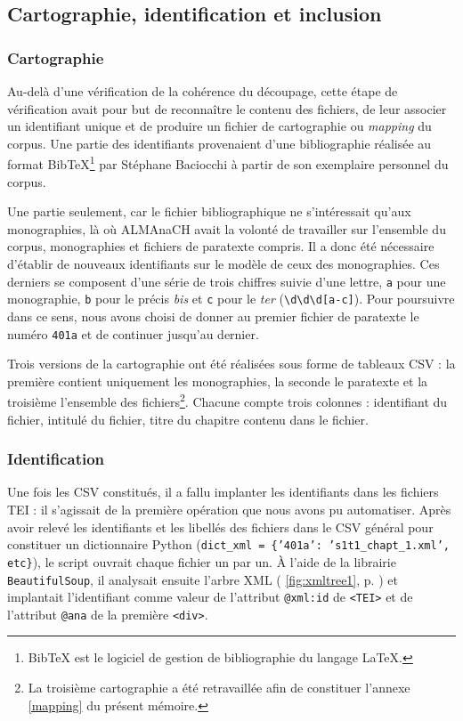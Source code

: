 \subsection{Cartographie, identification et inclusion}

\subsubsection{Cartographie}

Au-delà d'une vérification de la cohérence du découpage, cette étape de vérification avait pour but de reconnaître le contenu des fichiers, de leur associer un identifiant unique et de produire un fichier de cartographie ou \og \textit{mapping} \fg{} du corpus. Une partie des identifiants provenaient d'une bibliographie réalisée au format BibTeX\footnote{BibTeX est le logiciel de gestion de bibliographie du langage \LaTeX.} par Stéphane Baciocchi à partir de son exemplaire personnel du corpus.

Une partie seulement, car le fichier bibliographique ne s'intéressait qu'aux monographies, là où ALMAnaCH avait la volonté de travailler sur l'ensemble du corpus, monographies et fichiers de paratexte compris. Il a donc été nécessaire d'établir de nouveaux identifiants sur le modèle de ceux des monographies. Ces derniers se composent d'une série de trois chiffres suivie d'une lettre, \texttt{a} pour une monographie, \texttt{b} pour le précis \textit{bis} et \texttt{c} pour le \textit{ter} (\texttt{\textbackslash d\textbackslash d\textbackslash d[a-c]}). Pour poursuivre dans ce sens, nous avons choisi de donner au premier fichier de paratexte le numéro \texttt{401a} et de continuer jusqu'au dernier.

Trois versions de la cartographie ont été réalisées sous forme de tableaux CSV : la première contient uniquement les monographies, la seconde le paratexte et la troisième l'ensemble des fichiers\footnote{La troisième cartographie a été retravaillée afin de constituer l'annexe \ref{mapping} du présent mémoire.}. Chacune compte trois colonnes : identifiant du fichier, intitulé du fichier, titre du chapitre contenu dans le fichier.

\subsubsection{Identification}

Une fois les CSV constitués, il a fallu implanter les identifiants dans les fichiers TEI : il s'agissait de la première opération que nous avons pu automatiser. Après avoir relevé les identifiants et les libellés des fichiers dans le CSV général pour constituer un dictionnaire Python (\texttt{dict\_xml = \{'401a': 's1t1\_chapt\_1.xml', etc\}}), le script ouvrait chaque fichier un par un. À l'aide de la librairie \texttt{BeautifulSoup}, il analysait ensuite l'arbre XML (\fig{} \ref{fig:xmltree1}, p. \pageref{fig:xmltree1}) et implantait l'identifiant comme valeur de l'attribut \texttt{@xml:id} de \texttt{<TEI>} et de l'attribut \texttt{@ana} de la première \texttt{<div>}.

